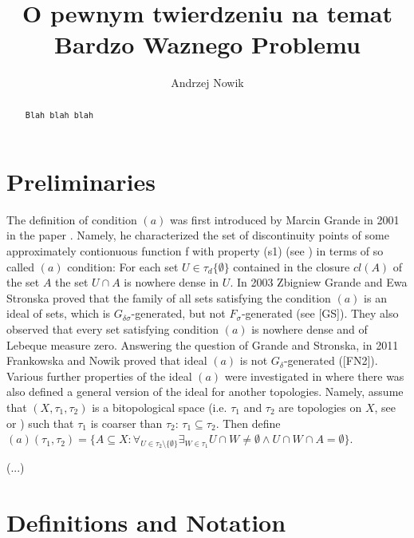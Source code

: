 \documentclass[12pt]{amsart}
\author{Andrzej Nowik}
\theoremstyle{plain}
\theoremstyle{definition}
\theoremstyle{remark}
\newcommand{\cl}{\mathit{cl}}
\newcommand{\dummy}{{\tt Blah blah blah}}
\newcommand{\aideal}{\mathit{(a)}}
\begin{document}
\title[
O pewnym twierdzeniu...
]{
O pewnym twierdzeniu na temat Bardzo Waznego Problemu
}

\begin{abstract}
\dummy
\end{abstract}

\maketitle

\section{Preliminaries}
The definition of condition $(a)$ was first introduced by Marcin Grande in 2001 in the paper
\cite{MarcinGrande}. Namely, he characterized the set of discontinuity points of some approximately contionuous function f with property
(s1) (see \cite{MarcinGrande}) in terms of so called $(a)$ condition:
For each set $U\in\tau_d\lbrace\emptyset\rbrace$ contained in the closure $\cl(A)$ of the set $A$ the
set $U \cap A$ is nowhere dense in $U$.
In 2003 Zbigniew Grande and Ewa Stronska proved that the family of all sets satisfying
the condition $(a)$ is an ideal of sets, which is $G_{\delta\sigma}$-generated, but not 
$F_{\sigma}$-generated 
(see [GS]). They also observed that every set satisfying condition $(a)$ is nowhere dense
and of Lebeque measure zero. Answering the question of Grande and Stronska,
in 2011 Frankowska and Nowik proved that ideal $(a)$ is not $G_{\delta}$-generated ([FN2]).
Various further properties of the ideal $(a)$ were investigated in \cite{N}
where there was also defined a general version of the ideal for another
topologies. Namely, assume
that $(X, \tau_1,\tau_2)$ is a bitopological space 
(i.e. $\tau_1$ and $\tau_2$ are topologies on $X$, 
see \cite{D} or )
such that $\tau_1$ is coarser than $\tau_2$:
$\tau_1 \subseteq \tau_2$. Then 
define $\aideal(\tau_1, \tau_2) = \{ A \subseteq X \colon
\forall_{U \in \tau_2 \setminus \{ \emptyset\}}
\exists_{W \in \tau_1} U \cap W \not= \emptyset \wedge
U \cap W \cap A = \emptyset\}$.

(...)

\section{Definitions and Notation}
\end{document}
